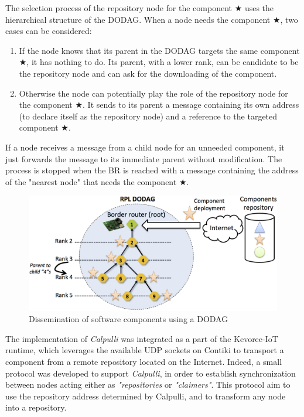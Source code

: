 The selection process of the repository node for the component $\bigstar$ uses the hierarchical structure of the DODAG. When a node needs the component $\bigstar$, two cases can be considered:

\begin{enumerate}
	\item If the node knows that its parent in the DODAG targets the same component $\bigstar$, it has nothing to do. Its parent, with a lower rank, can be candidate to be the repository node and can ask for the downloading of the component.
	\item Otherwise the node can potentially play the role of the repository node for the component $\bigstar$. It sends to its parent a message containing its own address (to declare itself as the repository node) and a reference to the targeted component $\bigstar$.
\end{enumerate}

If a node receives a message from a child node for an unneeded component, it just forwards the message to its immediate parent without modification. The process is stopped when the BR is reached with a message containing the address of the "nearest node" that needs the component $\bigstar$.

\begin{figure}[htb]
	\centering
	\includegraphics[width=0.98\columnwidth]{chapters/calpulli.images/MAR_dodag.png}
	\caption{Dissemination of software components using a DODAG} \label{fig:MARdodag}
\end{figure}


The implementation of \textit{Calpulli} was integrated as a part of the Kevoree-IoT runtime, which leverages the available UDP sockets on Contiki to transport a component from a remote repository located on the Internet.
Indeed, a small protocol was developed to support \textit{Calpulli}, in order to establish synchronization between nodes acting either as \textit{"repositories} or \textit{"claimers"}.
This protocol aim to use the repository address determined by Calpulli, and to transform any node into a repository.

